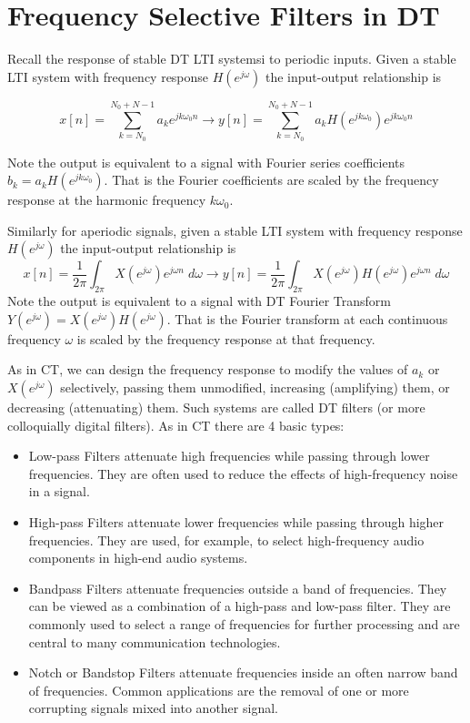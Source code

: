 \chapter{Frequency Selective Filters in DT}

Recall the response of stable DT LTI systemsi to periodic inputs. Given a stable LTI system with frequency response $H\left(e^{j\omega}\right)$ the input-output relationship is

\[
x[n] = \sum\limits_{k = N_0}^{N_0 + N-1} a_k e^{jk\omega_0n} \longrightarrow y[n] = \sum\limits_{k = N_0}^{N_0 + N-1} a_k H\left(e^{jk\omega_0}\right) e^{jk\omega_0n} 
\]

Note the output is equivalent to a signal with Fourier series coefficients $b_k = a_k H\left(e^{jk\omega_0}\right)$. That is the Fourier coefficients are scaled by the frequency response at the harmonic frequency $k\omega_0$.

Similarly for aperiodic signals, given a stable LTI system with frequency response $H\left(e^{j\omega}\right)$ the input-output relationship is
\[
x[n] = \frac{1}{2\pi} \int_{2\pi} X\left(e^{j\omega}\right) e^{j\omega n} \; d\omega \longrightarrow y[n] = \frac{1}{2\pi} \int_{2\pi} X\left(e^{j\omega}\right)H\left(e^{j\omega}\right) e^{j\omega n} \; d\omega
\]
Note the output is equivalent to a signal with DT Fourier Transform $Y\left(e^{j\omega}\right) = X\left(e^{j\omega}\right) H\left(e^{j\omega}\right)$. That is the Fourier transform at each continuous frequency $\omega$ is scaled by the frequency response at that frequency. 

As in CT, we can design the frequency response to modify the values of $a_k$ or $X\left(e^{j\omega}\right)$ selectively, passing them unmodified, increasing (amplifying) them, or decreasing (attenuating) them. Such systems are called DT filters (or more colloquially digital filters). As in CT there are 4 basic types:
\begin{itemize}
\item Low-pass Filters attenuate high frequencies while passing through lower frequencies. They are often used to reduce the effects of high-frequency noise in a signal.
\item High-pass Filters attenuate lower frequencies while passing through higher frequencies. They are used, for example, to select high-frequency audio components in high-end audio systems.
\item Bandpass Filters attenuate frequencies outside a band of frequencies. They can be viewed as a combination of a high-pass and low-pass filter. They are commonly used to select a range of frequencies for further processing and are central to many communication technologies. 
\item Notch or Bandstop Filters attenuate frequencies inside an often narrow band of frequencies. Common applications are the removal of one or more corrupting signals mixed into another signal.
\end{itemize}

